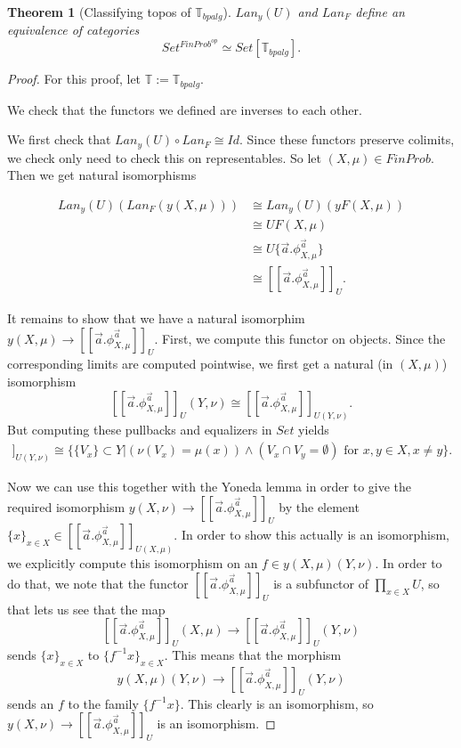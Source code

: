 \documentclass[a4paper]{amsproc}
\theoremstyle{plain}
\newtheorem{theorem}{Theorem}[section]
\theoremstyle{definition}
\theoremstyle{remark}
\numberwithin{equation}{section}
\newcommand{\ldoub}{[\![ }
\newcommand{\rdoub}{]\!]}
\begin{document}
\begin{theorem}[Classifying topos of $\mathbb{T}_{bpalg}$] \label{classifying}
$Lan_y(U)$ and $Lan_F$ define an equivalence of categories
\[
Set^{FinProb^{op}} \simeq Set[\mathbb{T}_{bpalg}].
\]
\end{theorem}
\begin{proof}
For this proof, let $\mathbb{T} := \mathbb{T}_{bpalg}$.

We check that the functors we defined are inverses to each other.

We first check that $Lan_y(U) \circ Lan_F \cong Id$. Since these functors preserve colimits, we check only need to check this on representables. So let $(X,\mu) \in FinProb$. Then we get natural isomorphisms

\begin{align*}
Lan_y(U)(Lan_F(y(X,\mu))) &\cong Lan_y(U)(yF(X,\mu)) \\
&\cong UF(X,\mu) \\
&\cong U \{\vec{a} . \phi^{\vec{a}}_{X,\mu}\} \\
&\cong \ldoub \vec{a} . \phi^{\vec{a}}_{X,\mu} \rdoub_U .
\end{align*}

It remains to show that we have a natural isomorphim $y (X,\mu) \to \ldoub \vec{a} . \phi^{\vec{a}}_{X,\mu} \rdoub_U$. First, we compute this functor on objects. Since the corresponding limits are computed pointwise, we first get a natural (in $(X,\mu)$) isomorphism
\[
\ldoub \vec{a} . \phi^{\vec{a}}_{X,\mu} \rdoub_U (Y,\nu) \cong \ldoub \vec{a} . \phi^{\vec{a}}_{X,\mu} \rdoub_{U(Y,\nu)} .
\]
But computing these pullbacks and equalizers in $Set$ yields
\begin{align*}
\ldoub \vec{a} . \phi^{\vec{a}}_{X,\mu} \rdoub_{U(Y,\nu)} \cong
\{\{V_x\} \subset Y | (\nu(V_x) = \mu(x)) \wedge (V_x \cap V_y = \emptyset) \text{ for } x,y \in X, x \neq y\} .
\end{align*}

Now we can use this together with the Yoneda lemma in order to give the required isomorphism $y (X,\nu) \to \ldoub \vec{a} . \phi^{\vec{a}}_{X,\mu} \rdoub_U$ by the element $\{x\}_{x \in X} \in \ldoub \vec{a} . \phi^{\vec{a}}_{X,\mu} \rdoub_{U(X,\mu)}$. In order to show this actually is an isomorphism, we explicitly compute this isomorphism on an $f \in y (X,\mu) (Y,\nu)$. In order to do that, we note that the functor $\ldoub \vec{a} . \phi^{\vec{a}}_{X,\mu} \rdoub_U$ is a subfunctor of $\prod_{x \in X} U$, so that lets us see that the map
\[
\ldoub \vec{a} . \phi^{\vec{a}}_{X,\mu} \rdoub_U(X,\mu) \to \ldoub \vec{a} . \phi^{\vec{a}}_{X,\mu} \rdoub_U(Y,\nu)
\]
sends $\{x\}_{x \in X}$ to $\{f^{-1} x\}_{x \in X}$. This means that the morphism
\[
y (X,\mu) (Y,\nu) \to \ldoub \vec{a} . \phi^{\vec{a}}_{X,\mu} \rdoub_U(Y,\nu)
\]
sends an $f$ to the family $\{f^{-1} x\}$. This clearly is an isomorphism, so $y (X,\nu) \to \ldoub \vec{a} . \phi^{\vec{a}}_{X,\mu} \rdoub_U$ is an isomorphism.


\end{proof}
\end{document}
